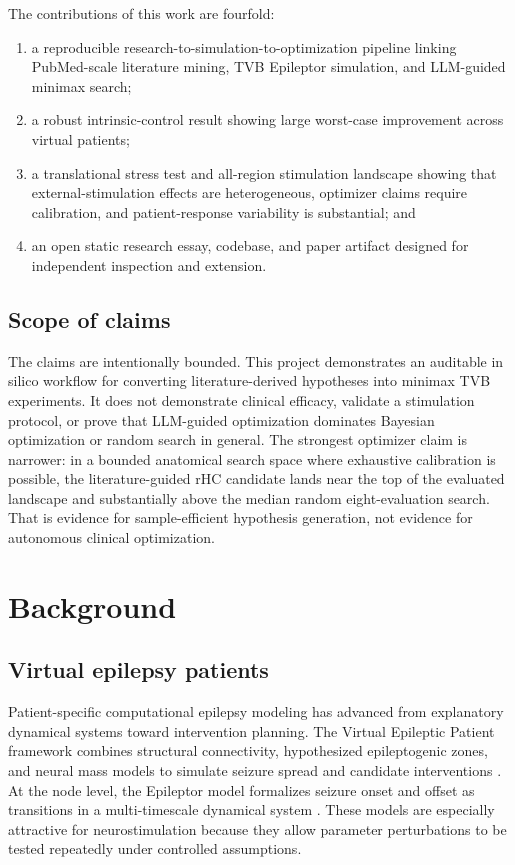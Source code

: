 \documentclass{article}
\begin{document}
The contributions of this work are fourfold:
\begin{enumerate}
  \item a reproducible research-to-simulation-to-optimization pipeline linking PubMed-scale literature mining, TVB Epileptor simulation, and LLM-guided minimax search;
  \item a robust intrinsic-control result showing large worst-case improvement across virtual patients;
  \item a translational stress test and all-region stimulation landscape showing that external-stimulation effects are heterogeneous, optimizer claims require calibration, and patient-response variability is substantial; and
  \item an open static research essay, codebase, and paper artifact designed for independent inspection and extension.
\end{enumerate}

\subsection{Scope of claims}
The claims are intentionally bounded. This project demonstrates an auditable in silico workflow for converting literature-derived hypotheses into minimax TVB experiments. It does not demonstrate clinical efficacy, validate a stimulation protocol, or prove that LLM-guided optimization dominates Bayesian optimization or random search in general. The strongest optimizer claim is narrower: in a bounded anatomical search space where exhaustive calibration is possible, the literature-guided rHC candidate lands near the top of the evaluated landscape and substantially above the median random eight-evaluation search. That is evidence for sample-efficient hypothesis generation, not evidence for autonomous clinical optimization.

\section{Background}
\subsection{Virtual epilepsy patients}
Patient-specific computational epilepsy modeling has advanced from explanatory dynamical systems toward intervention planning. The Virtual Epileptic Patient framework combines structural connectivity, hypothesized epileptogenic zones, and neural mass models to simulate seizure spread and candidate interventions \cite{proix2017vep}. At the node level, the Epileptor model formalizes seizure onset and offset as transitions in a multi-timescale dynamical system \cite{jirsa2014seizure}. These models are especially attractive for neurostimulation because they allow parameter perturbations to be tested repeatedly under controlled assumptions.
\end{document}

